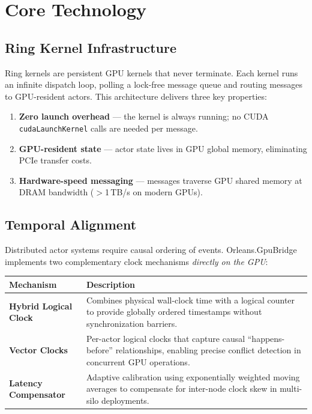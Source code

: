 \documentclass[11pt,a4paper]{article}
\begin{document}
\section{Core Technology}

\subsection{Ring Kernel Infrastructure}

Ring kernels are persistent GPU kernels that never terminate. Each kernel
runs an infinite dispatch loop, polling a lock-free message queue and
routing messages to GPU-resident actors. This architecture delivers three
key properties:

\begin{enumerate}[leftmargin=1.4em, itemsep=3pt]
  \item \textbf{Zero launch overhead} --- the kernel is always running;
        no CUDA \texttt{cudaLaunchKernel} calls are needed per message.
  \item \textbf{GPU-resident state} --- actor state lives in GPU global
        memory, eliminating PCIe transfer costs.
  \item \textbf{Hardware-speed messaging} --- messages traverse GPU shared
        memory at DRAM bandwidth ($>$1\,TB/s on modern GPUs).
\end{enumerate}

\subsection{Temporal Alignment}

Distributed actor systems require causal ordering of events.
Orleans.GpuBridge implements two complementary clock mechanisms
\emph{directly on the GPU}:

\vspace{0.5em}
\noindent
\renewcommand{\arraystretch}{1.2}
\begin{tabularx}{\textwidth}{>{\bfseries\color{brand}}l X}
\toprule
\textbf{Mechanism} & \textbf{Description} \\
\midrule
Hybrid Logical Clock &
  Combines physical wall-clock time with a logical counter to provide
  globally ordered timestamps without synchronization barriers. \\
Vector Clocks &
  Per-actor logical clocks that capture causal ``happens-before''
  relationships, enabling precise conflict detection in concurrent
  GPU operations. \\
Latency Compensator &
  Adaptive calibration using exponentially weighted moving averages
  to compensate for inter-node clock skew in multi-silo deployments. \\
\bottomrule
\end{tabularx}
\vspace{0.5em}
\end{document}
